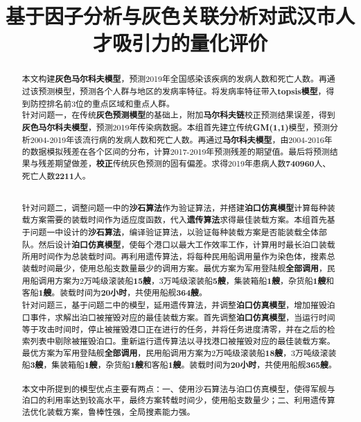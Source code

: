 \documentclass{whutmod}
\title{基于因子分析与灰色关联分析对武汉市人才吸引力的量化评价}
\begin{document}
	
	\begin{abstract}



本文构建\textbf{灰色马尔科夫模型}，预测2019年全国感染该疾病的发病人数和死亡人数。再通过该预测模型，预测各个人群与地区的发病率特征。将发病率特征带入\textbf{topsis模型}，得到防控排名前$3$位的重点区域和重点人群。
~\\

针对问题一，在传统\textbf{灰色预测模型}的基础上，附加\textbf{马尔科夫链}校正预测结果误差，得到\textbf{灰色马尔科夫模型}，预测2019年传染病数据。本组首先建立传统\textbf{GM(1,1)}模型，预测分析2004-2019年该流行病的发病人数和死亡人数。再通过\textbf{马尔科夫模型}，由2004-2016年的数据模拟残差在各个区间的分布，计算2017-2019年预测残差的期望值。最后将预测结果与残差期望做差，\textbf{校正}传统灰色预测的固有偏差。求得2019年患病人数\textbf{740960}人、死亡人数\textbf{2211}人。
	
~\\

针对问题二，调整问题一中的\textbf{沙石算法}作为验证算法，并搭建\textbf{泊口仿真模型}计算每种装载方案需要的装载时间作为适应度函数，代入\textbf{遗传算法}求得最佳装载方案。本组首先基于问题一中设计的\textbf{沙石算法}，编译验证算法，以验证每种装载方案是否能装载全体部队。然后设计\textbf{泊口仿真模型}，使每个港口以最大工作效率工作，计算用时最长泊口装载所用时间作为总装载时间。再利用遗传算法，将每种民用船调用量作为染色体，搜素总装载时间最少，使用总船支数量最少的调用方案。最优方案为军用登陆舰\textbf{全部调用}，民用船调用方案为2万吨级滚装船\textbf{15艘}，3万吨级滚装船\textbf{5艘}，集装箱船\textbf{1艘}，杂货船\textbf{1艘}和客船\textbf{1艘}。装载时间为\textbf{20小时}，共使用船舰\textbf{364艘}。
~\\

针对问题三，基于问题二中的模型，延用遗传算法，并调整\textbf{泊口仿真模型}，增加摧毁泊口事件，求解出泊口被摧毁对应的最佳装载方案。首先调整\textbf{泊口仿真模型}，当运行时间等于攻击时间时，停止被摧毁港口正在进行的任务，并将任务进度清零，并在之后的检索列表中剔除被摧毁泊口。重新运行遗传算法以寻找港口被摧毁对应的最佳装载方案。最优方案为军用登陆舰\textbf{全部调用}，民用船调用方案为2万吨级滚装船\textbf{18艘}，3万吨级滚装船\textbf{3艘}，集装箱船\textbf{1艘}，杂货船\textbf{1艘}和客船\textbf{1艘}。装载时间为\textbf{20小时}，共使用船舰\textbf{365艘}。
~\\

本文中所提到的模型优点主要有两点：一、使用沙石算法与泊口仿真模型，使得军舰与泊口的利用率达到较高水平，最终方案转载时间少，使用船支数量少；二、利用遗传算法优化装载方案，鲁棒性强，全局搜素能力强。

	
  


	\end{abstract}
	\tableofcontents
	\newpage	%
	
\end{document}
